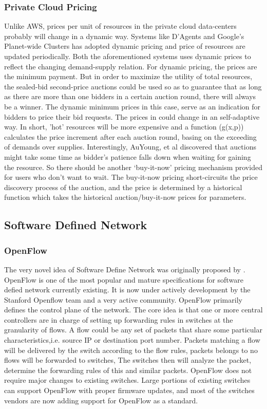 \documentclass[a4paper,11pt,twocolumn]{article}
\begin{document}
\subsubsection{Private Cloud Pricing}
Unlike AWS, prices per unit of resources in the private cloud data-centers probably will change in a dynamic way.  Systems like D'Agents\cite{dartmouth} and Google's Planet-wide 
Clusters\cite{google} has adopted dynamic pricing and price of resources are updated periodically. Both the aforementioned systems uses dynamic prices to 
reflect the changing demand-supply relation. For dynamic pricing, the prices are the minimum payment. But in order to maximize the utility of total resources,
the sealed-bid second-price auctions \cite{second price} could be used so as to guarantee that as long as there are more than one bidders in a certain auction round, 
there will always be a winner. The dynamic minimum prices in this case, serve as an indication for bidders to price their bid requests. The prices in \cite{google} could 
change in an self-adaptive way. In short, 'hot' resources will be more expensive and a function (g(x,p)) calculates the price increment after each auction round, basing on the 
exceeding of demands over supplies. Interestingly, AuYoung, et al \cite{ucsd} discovered that auctions might take some time as bidder's patience falls down
when waiting for gaining the resource. So there should be another `buy-it-now' pricing mechanism provided for users who don't want to wait. The buy-it-now
pricing short-circuits the price discovery process of the auction, and the price is determined by a historical function which takes the historical auction/buy-it-now
prices for parameters.


\subsection{Software Defined Network}
\subsubsection{OpenFlow}
The very novel idea of Software Define Network was originally proposed by \cite{Greenberg_abstracta}. OpenFlow is one of the most popular and mature specifications for software defied network currently existing.  It is now   under actively development by the Stanford Openflow team and a very active  community.
OpenFlow primarily defines the control plane of the network. The core idea is that one or more central controllers are in charge of setting up forwarding rules in switches at the granularity of flows. A flow could be any set of packets that share some particular characteristics,i.e. source IP or destination port number. Packets matching a flow will be delivered by the switch according  to the flow rules, packets belongs to no flows will be forwarded to switches, The switches then will analyze the packet, determine the forwarding rules of this and similar packets.
OpenFlow does not require major changes to existing switches. Large portions of existing switches can support OpenFlow with proper firmware updates, and most of the switches vendors are now adding support for OpenFlow as a standard.
\end{document}
